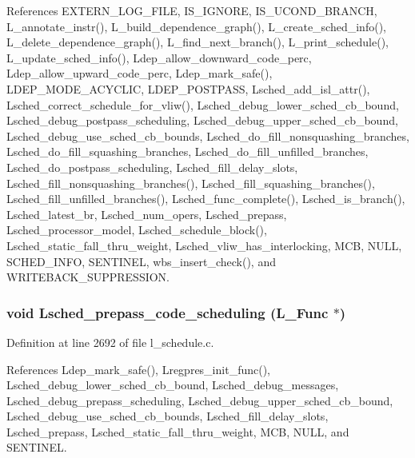 References EXTERN\_\-LOG\_\-FILE, IS\_\-IGNORE, IS\_\-UCOND\_\-BRANCH, L\_\-annotate\_\-instr(), L\_\-build\_\-dependence\_\-graph(), L\_\-create\_\-sched\_\-info(), L\_\-delete\_\-dependence\_\-graph(), L\_\-find\_\-next\_\-branch(), L\_\-print\_\-schedule(), L\_\-update\_\-sched\_\-info(), Ldep\_\-allow\_\-downward\_\-code\_\-perc, Ldep\_\-allow\_\-upward\_\-code\_\-perc, Ldep\_\-mark\_\-safe(), LDEP\_\-MODE\_\-ACYCLIC, LDEP\_\-POSTPASS, Lsched\_\-add\_\-isl\_\-attr(), Lsched\_\-correct\_\-schedule\_\-for\_\-vliw(), Lsched\_\-debug\_\-lower\_\-sched\_\-cb\_\-bound, Lsched\_\-debug\_\-postpass\_\-scheduling, Lsched\_\-debug\_\-upper\_\-sched\_\-cb\_\-bound, Lsched\_\-debug\_\-use\_\-sched\_\-cb\_\-bounds, Lsched\_\-do\_\-fill\_\-nonsquashing\_\-branches, Lsched\_\-do\_\-fill\_\-squashing\_\-branches, Lsched\_\-do\_\-fill\_\-unfilled\_\-branches, Lsched\_\-do\_\-postpass\_\-scheduling, Lsched\_\-fill\_\-delay\_\-slots, Lsched\_\-fill\_\-nonsquashing\_\-branches(), Lsched\_\-fill\_\-squashing\_\-branches(), Lsched\_\-fill\_\-unfilled\_\-branches(), Lsched\_\-func\_\-complete(), Lsched\_\-is\_\-branch(), Lsched\_\-latest\_\-br, Lsched\_\-num\_\-opers, Lsched\_\-prepass, Lsched\_\-processor\_\-model, Lsched\_\-schedule\_\-block(), Lsched\_\-static\_\-fall\_\-thru\_\-weight, Lsched\_\-vliw\_\-has\_\-interlocking, MCB, NULL, SCHED\_\-INFO, SENTINEL, wbs\_\-insert\_\-check(), and WRITEBACK\_\-SUPPRESSION.
\subsubsection{\setlength{\rightskip}{0pt plus 5cm}void Lsched\_\-prepass\_\-code\_\-scheduling (L\_\-Func $\ast$)}\label{l__schedule_8h_c38e8a63d0a4f9ab39d65a7f83d59a7d}




Definition at line 2692 of file l\_\-schedule.c.

References Ldep\_\-mark\_\-safe(), Lregpres\_\-init\_\-func(), Lsched\_\-debug\_\-lower\_\-sched\_\-cb\_\-bound, Lsched\_\-debug\_\-messages, Lsched\_\-debug\_\-prepass\_\-scheduling, Lsched\_\-debug\_\-upper\_\-sched\_\-cb\_\-bound, Lsched\_\-debug\_\-use\_\-sched\_\-cb\_\-bounds, Lsched\_\-fill\_\-delay\_\-slots, Lsched\_\-prepass, Lsched\_\-static\_\-fall\_\-thru\_\-weight, MCB, NULL, and SENTINEL.

